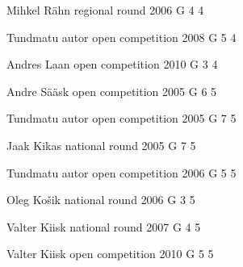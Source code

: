 \documentclass[11pt]{article}
\begin{document}
\ylDisplay{} %
{Mihkel Rähn} %
{regional round} %
{2006} %
{G 4} %
{4} %
{

\ifEngSolution
\fi
}

\ylDisplay{} %
{Tundmatu autor} %
{open competition} %
{2008} %
{G 5} %
{4} %
{

\ifEngSolution
\fi
}

\ylDisplay{} %
{Andres Laan} %
{open competition} %
{2010} %
{G 3} %
{4} %
{

\ifEngSolution
\fi
}

\ylDisplay{} %
{Andre Sääsk} %
{open competition} %
{2005} %
{G 6} %
{5} %
{

\ifEngSolution
\fi
}

\ylDisplay{} %
{Tundmatu autor} %
{open competition} %
{2005} %
{G 7} %
{5} %
{

\ifEngSolution
\fi
}

\ylDisplay{} %
{Jaak Kikas} %
{national round} %
{2005} %
{G 7} %
{5} %
{

\ifEngSolution
\fi
}

\ylDisplay{} %
{Tundmatu autor} %
{open competition} %
{2006} %
{G 5} %
{5} %
{

\ifEngSolution
\fi
}

\ylDisplay{} %
{Oleg Košik} %
{national round} %
{2006} %
{G 3} %
{5} %
{

\ifEngSolution
\fi
}

\ylDisplay{} %
{Valter Kiisk} %
{national round} %
{2007} %
{G 4} %
{5} %
{

\ifEngSolution
\fi
}

\ylDisplay{} %
{Valter Kiisk} %
{open competition} %
{2010} %
{G 5} %
{5} %
{

\ifEngSolution
\fi
}
\end{document}
